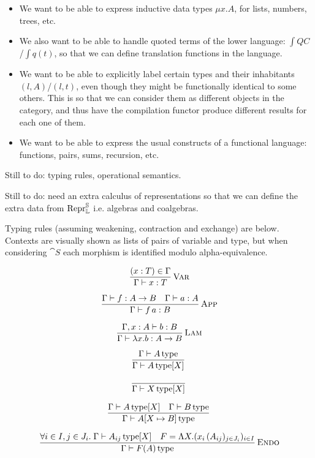 \begin{itemize}
  \item We want to be able to express inductive data types $\mu x . A$, for lists,
        numbers, trees, etc.
  \item We also want to be able to handle quoted terms of the lower language: $\int{Q}
          C$/$\int{q}(t)$, so that we can define translation functions in the language.
  \item We want to be able to explicitly label certain types and their inhabitants $(l,
          A)$/$(l, t)$, even though they might be functionally identical to some others.
        This is so that we can consider them as different objects in the category, and
        thus have the compilation functor produce different results for each one of
        them.
  \item We want to be able to express the usual constructs of a functional language:
        functions, pairs, sums, recursion, etc.
\end{itemize}

Still to do: typing rules, operational semantics.

Still to do: need an extra calculus of representations so that we can define
the extra data from $\Repr _{\cat L} ^{\cat S}$ i.e. algebras and coalgebras.

Typing rules (assuming weakening, contraction and exchange) are below. Contexts
are visually shown as lists of pairs of variable and type, but when considering
$\cat S$ each morphism is identified modulo alpha-equivalence.

$$
  \infrule[Var]{(x : T) \in \Gamma}{\Gamma \vdash x : T}
$$

$$
  \infrule[App]{\Gamma \vdash f : A \to B \quad \Gamma \vdash a : A}{\Gamma \vdash f\,a : B}
$$

$$
  \infrule[Lam]{\Gamma, x : A \vdash b : B}{\Gamma \vdash \lambda x . b : A \to B}
$$

$$
  \infrule{\Gamma \vdash \istype{A}}{\Gamma \vdash \istype{A}[X]}
$$

$$
  \infrule{}{\Gamma \vdash \istype{X}[X]}
$$

$$
  \infrule{\Gamma \vdash \istype{A}[X] \quad \Gamma \vdash \istype{B}}{\Gamma \vdash \istype{A[X \mapsto B]}}
$$

$$
  \infrule[Endo]{
    \forall i \in I,j \in J_i. \; \Gamma \vdash \istype{A_{ij}}[X] \quad
    F = \Lambda X . (x_i \, (A_{ij})_{j \in J_i})_{i \in I}
  }{\Gamma \vdash \istype{F(A)}}
$$

